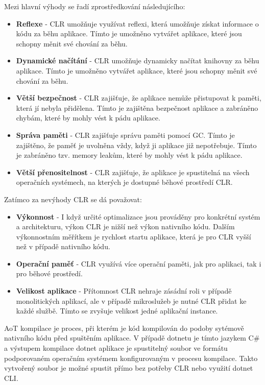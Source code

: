 Mezi hlavní výhody se řadí zprostředkování následujícího:
\begin{itemize}
    \item  \textbf{Reflexe} - CLR umožňuje využívat reflexi, která umožňuje získat informace o kódu za běhu aplikace. Tímto je umožněno vytvářet aplikace, které jsou schopny měnit své chování za běhu.
    \item \textbf{Dynamické načítání} - CLR umožňuje dynamicky načítat knihovny za běhu aplikace. Tímto je umožněno vytvářet aplikace, které jsou schopny měnit své chování za běhu.
    \item \textbf{Větší bezpečnost} - CLR zajišťuje, že aplikace nemůže přistupovat k paměti, která jí nebyla přidělena. Tímto je zajištěna bezpečnost aplikace a zabráněno chybám, které by mohly vést k pádu aplikace.
    \item \textbf{Správa paměti} - CLR zajišťuje správu paměti pomocí GC. Tímto je zajištěno, že paměť je uvolněna vždy, když ji aplikace již nepotřebuje. Tímto je zabráněno tzv. memory leakům, které by mohly vést k pádu aplikace.
    \item \textbf{Větší přenositelnost} - CLR zajišťuje, že aplikace je spustitelná na všech operačních systémech, na kterých je dostupné běhové prostředí CLR.
\end{itemize}

Zatímco za nevýhody CLR se dá považovat:
\begin{itemize}
    \item  \textbf{Výkonnost} - I když určité optimalizace jsou prováděny pro konkrétní systém a architekturu, výkon CLR je nižší než výkon nativního kódu. Dalším výkonnostním měřítkem je rychlost startu aplikace, která je pro CLR vyšší než v případě nativního kódu.
    \item \textbf{Operační paměť} - CLR využívá více operační paměti, jak pro aplikaci, tak i pro běhové prostředí.
    \item \textbf{Velikost aplikace} - Přítomnost CLR nehraje zásádní roli v případě monolitických aplikací, ale v případě mikroslužeb je nutné CLR přidat ke každé službě. Tímto se zvyšuje velikost jedné aplikační instance.
\end{itemize}

AoT kompilace je proces, při kterém je kód kompilován do podoby sytémově nativního kódu před spuštěním aplikace. V případě dotnetu je tímto jazykem C\# a výstupem kompilace dotnet aplikace je spustitelný soubor ve formátu podporovaném operačním systémem konfigurovaným v procesu kompilace. Takto vytvořený soubor je možné spustit přímo bez potřeby CLR nebo využití dotnet CLI. 

